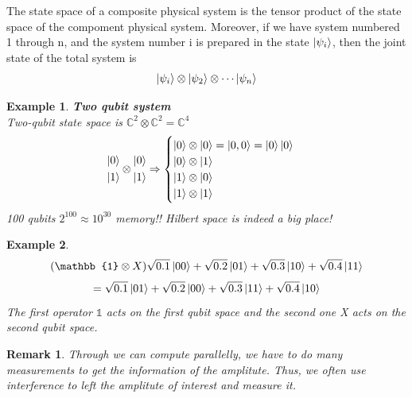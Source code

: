 \documentclass[]{article}
\newtheorem*{remark}{Remark}
\newtheorem*{example}{Example}
\theoremstyle{nonumberplain}
\begin{document}
\begin{postu}
The state space of a composite physical system is the tensor product of the state space of the compoment physical system. Moreover, if we have system numbered 1 through n, and the system number i is prepared in the state $\ket{\psi_{i}}$, then the joint state of the total system is
\[
	\ket{\psi_{i}}\otimes\ket{\psi_{2}}\otimes\cdots\ket{\psi_{n}}
\] 
\end{postu}
\begin{example}
\textbf{Two qubit system} \\
Two-qubit state space is $\mathbb{C}^{2}\otimes\mathbb{C}^{2}=\mathbb{C}^{4}$
\begin{equation*}
\begin{aligned}
\ket{0} \\
\ket{1}
\end{aligned}
\otimes
\begin{aligned}
\ket{0} \\
\ket{1}
\end{aligned}
\Rightarrow
\begin{cases}
\ket{0} \otimes \ket{0}  = \ket{0,0} = \ket{0}\ket{0}\\
\ket{0} \otimes \ket{1} \\
\ket{1} \otimes \ket{0} \\
\ket{1} \otimes \ket{1} \\
\end{cases}
\end{equation*}
100 qubits $2^{100}\approx 10^{30}$ memory!! Hilbert space is indeed a big place!
\end{example}
\begin{example}
\[
	(\mathbb{1}\otimes X)\sqrt{0.1}\ket{00}+\sqrt{0.2}\ket{01}+\sqrt{0.3}\ket{10}+\sqrt{0.4}\ket{11}
\] 
\[
= \sqrt{0.1}\ket{01}+\sqrt{0.2}\ket{00}+\sqrt{0.3}\ket{11}+\sqrt{0.4}\ket{10}
\] 
The first operator $\mathbb{1}$ acts on the first qubit space and the second one X acts on the second qubit space.  
\end{example}
\begin{remark}
Through we can compute parallelly, we have to do many measurements to get the information of the amplitute. Thus, we often use interference to left the amplitute of interest and measure it.
\end{remark}
\end{document}
